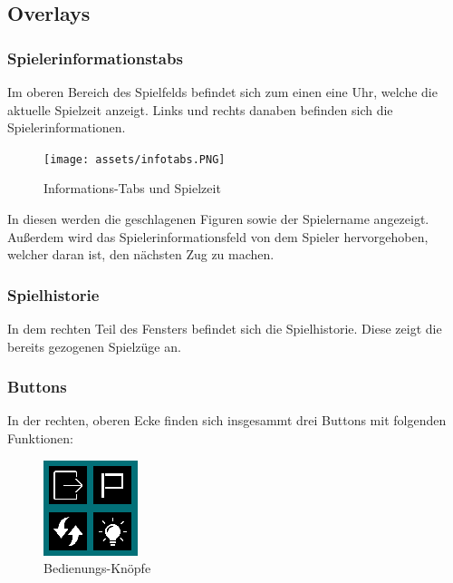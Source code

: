 \documentclass[a4paper, 10pt]{scrartcl}
\begin{document}
\subsection{Overlays}

\subsubsection{Spielerinformationstabs}
Im oberen Bereich des Spielfelds befindet sich zum einen eine Uhr, welche die aktuelle Spielzeit anzeigt. Links und rechts danaben befinden sich die Spielerinformationen.

\begin{figure}[h]
        \centering
        \texttt{[image: assets/infotabs.PNG]}
        \caption{Informations-Tabs und Spielzeit}
\end{figure}
In diesen werden die geschlagenen Figuren sowie der Spielername angezeigt. Außerdem wird das Spielerinformationsfeld von dem Spieler hervorgehoben, welcher daran ist, den
nächsten Zug zu machen.

\subsubsection{Spielhistorie}

In dem rechten Teil des Fensters befindet sich die Spielhistorie. Diese zeigt die bereits gezogenen Spielzüge an. 

\subsubsection{Buttons}
In der rechten, oberen Ecke finden sich insgesammt drei Buttons mit folgenden Funktionen:
\begin{figure}
        \centering
        \includegraphics{assets/Buttons.PNG}
        \caption{Bedienungs-Knöpfe}
\end{figure}
\end{document}
